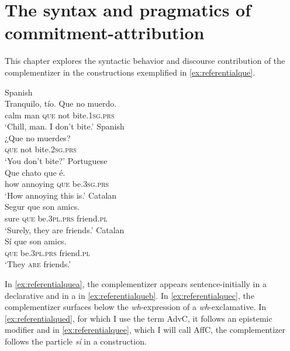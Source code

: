 
\chapter{The syntax and pragmatics of commitment-attribution}\label{sec:presupint}
This chapter explores the syntactic behavior and  discourse contribution of the complementizer in the constructions exemplified in \eqref{ex:referentialque}. 

\ea \label{ex:referentialque}
	\ea\label{ex:referentialquea}
			Spanish\\
	\gll Tranquilo, tío.  Que no muerdo. \\
		calm man  \textsc{que}  not bite.\textsc{1sg.prs}\\
		\glt `Chill, man. I don't bite.'
		\ex\label{ex:referentialqueb}
				Spanish\\
		\gll ¿Que no muerdes? \\
		\textsc{que} not bite.\textsc{2sg.prs}\\
		\glt `You don't bite?'
			\ex\label{ex:referentialquec}
			Portuguese\\ 
			\gll Que chato que é. \\
		how annoying \textsc{que}  be.\textsc{3sg.prs}\\
		\glt `How annoying this is.'
			\ex\label{ex:referentialqued}
			Catalan\\
			\gll Segur que son amics. \\
		sure \textsc{que}     be.\textsc{3pl.prs} friend.\textsc{pl}\\
		\glt `Surely, they are friends.'
		\ex\label{ex:referentialquee}
		Catalan\\
		\gll Sí que son amics. \\
		\textsc{} \textsc{que}   be.\textsc{3pl.prs} friend.\textsc{pl}\\
		\glt `They \textsc{are} friends.'
	\z
\z

In \eqref{ex:referentialquea}, the complementizer appears sentence-initially in a declarative and in a  in \eqref{ex:referentialqueb}. In \eqref{ex:referentialquec}, the complementizer surfaces below the \textit{wh}-ex\-pres\-sion of a \textit{wh}-exclamative. In \eqref{ex:referentialqued}, for which I use the term AdvC, it follows an epistemic modifier and in \eqref{ex:referentialquee}, which I will call AffC, the complementizer follows the  particle \emph{sí} in a  construction.



